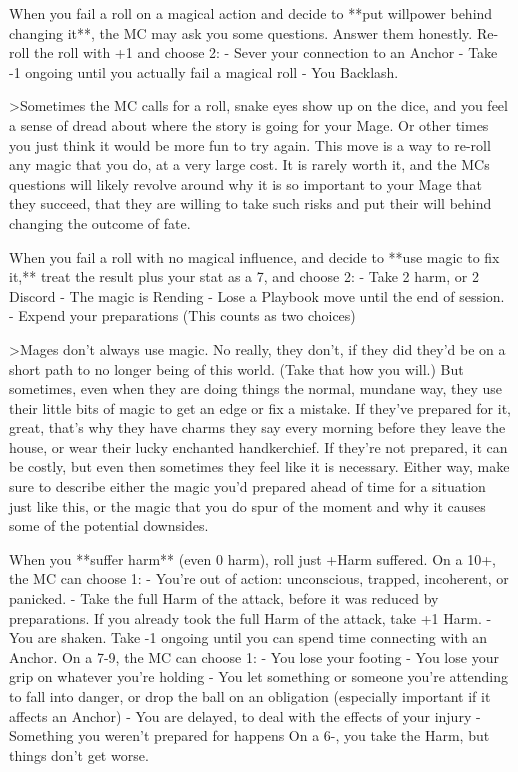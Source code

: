 \documentclass[
  oneside,
  statementpaper,
  9pt]{memoir}
\begin{document}
\begin{Player}
When you fail a roll on a magical action and decide to **put willpower behind changing it**, the MC may ask you some questions. Answer them honestly. Re-roll the roll with +1 and choose 2:
- Sever your connection to an Anchor
- Take -1 ongoing until you actually fail a magical roll
- You Backlash.

>Sometimes the MC calls for a roll, snake eyes show up on the dice, and you feel a sense of dread about where the story is going for your Mage. Or other times you just think it would be more fun to try again. This move is a way to re-roll any magic that you do, at a very large cost. It is rarely worth it, and the MCs questions will likely revolve around why it is so important to your Mage that they succeed, that they are willing to take such risks and put their will behind changing the outcome of fate.

When you fail a roll with no magical influence, and decide to **use magic to fix it,** treat the result plus your stat as a 7, and choose 2:
- Take 2 harm, or 2 Discord
- The magic is Rending
- Lose a Playbook move until the end of session.
- Expend your preparations (This counts as two choices)

>Mages don’t always use magic. No really, they don’t, if they did they’d be on a short path to no longer being of this world. (Take that how you will.) But sometimes, even when they are doing things the normal, mundane way, they use their little bits of magic to get an edge or fix a mistake. If they’ve prepared for it, great, that’s why they have charms they say every morning before they leave the house, or wear their lucky enchanted handkerchief. If they’re not prepared, it can be costly, but even then sometimes they feel like it is necessary. Either way, make sure to describe either the magic you’d prepared ahead of time for a situation just like this, or the magic that you do spur of the moment and why it causes some of the potential downsides.

When you **suffer harm** (even 0 harm), roll just +Harm suffered. On a 10+, the MC can choose 1:
- You’re out of action: unconscious, trapped, incoherent, or panicked.
- Take the full Harm of the attack, before it was reduced by preparations. If you already took the full Harm of the attack, take +1 Harm.
- You are shaken. Take -1 ongoing until you can spend time connecting with an Anchor. 
On a 7-9, the MC can choose 1:
- You lose your footing
- You lose your grip on whatever you’re holding
-  You let something or someone you’re attending to fall into danger, or drop the ball on an obligation (especially important if it affects an Anchor)
- You are delayed, to deal with the effects of your injury
- Something you weren’t prepared for happens 
On a 6-, you take the Harm, but things don’t get worse.


\end{Player}
\end{document}

